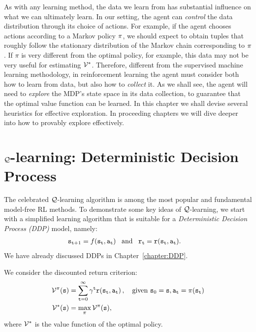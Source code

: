 As with any learning method, the data we learn from has substantial influence on what we can ultimately learn. In our setting, the agent can \textit{control} the data distribution through its choice of actions. For example, if the agent chooses actions according to a Markov policy $\pi$, we should expect to obtain tuples that roughly follow the stationary distribution of the Markov chain corresponding to $\pi$. If $\pi$ is very different from the optimal policy, for example, this data may not be very useful for estimating $\mathcal{V}^*$. Therefore, different from the supervised machine learning methodology, in reinforcement learning the agent must consider both how to learn from data, but also how to \textit{collect} it. As we shall see, the agent will need to \textit{explore} the MDP's state space in its data collection, to guarantee that the optimal value function can be learned. In this chapter we shall devise several heuristics for effective exploration. In proceeding chapters we will dive deeper into how to provably explore effectively.


\section{ $\mathcal{Q}$-learning: Deterministic Decision Process}\label{sec:q_learning_DDP}

The celebrated $\mathcal{Q}$-learning algorithm is among the most popular and fundamental model-free RL methods.
To demonstrate some key ideas of $\mathcal{Q}$-learning, we start with a
simplified learning algorithm that is suitable for a {\em
Deterministic Decision Process (DDP)} model, namely:
\begin{align*}
& {\tt s}_{{\tt t}+1}=f({\tt s}_{\tt t},{\tt a}_{\tt t}) \;\;\;\text{and}\;\;\;
{\tt r}_{\tt t}={\tt r}({\tt s}_{\tt t},{\tt a}_{\tt t}).
\end{align*}
We have already discussed DDPs in Chapter~\ref{chapter:DDP}.


We consider the discounted return criterion:
\begin{align*}
\mathcal{V}^{\pi}({\tt s}) &=\sum_{{\tt t}=0}^\infty \gamma^{\tt t}
{\tt r}({\tt s}_{\tt t},{\tt a}_{\tt t})\,,
\quad \text{given } {\tt s}_0={\tt s}, {\tt a}_{\tt t}=\pi({\tt s}_{\tt t})\\
\mathcal{V}^*({\tt s}) &= \max_\pi \mathcal{V}^\pi({\tt s}),
\end{align*}
where $\mathcal{V}^*$ is the value function of the optimal policy.

